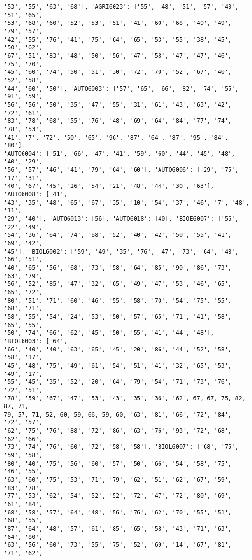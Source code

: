 \documentclass[11pt]{article}
\begin{document}
\begin{Verbatim}[commandchars=\\\{\}]
'53', '55', '63', '68'], 'AGRI6023': ['55', '48', '51', '57', '40', '51', '65',
'53', '68', '60', '52', '53', '51', '41', '60', '68', '49', '49', '79', '57',
'42', '55', '76', '41', '75', '64', '65', '53', '55', '38', '45', '50', '62',
'67', '51', '83', '48', '50', '56', '47', '58', '47', '47', '46', '75', '70',
'45', '60', '74', '50', '51', '30', '72', '70', '52', '67', '40', '52', '58',
'44', '60', '50'], 'AUTO6003': ['57', '65', '66', '82', '74', '55', '91', '59',
'56', '56', '50', '35', '47', '55', '31', '61', '43', '63', '42', '72', '61',
'83', '78', '68', '55', '76', '48', '69', '64', '84', '77', '74', '78', '53',
'41', '7', '72', '50', '65', '96', '87', '64', '87', '95', '84', '80'],
'AUTO6004': ['51', '66', '47', '41', '59', '60', '44', '45', '48', '40', '29',
'56', '57', '46', '41', '79', '64', '60'], 'AUTO6006': ['29', '75', '17', '31',
'40', '67', '45', '26', '54', '21', '48', '44', '30', '63'], 'AUTO6008': ['41',
'43', '35', '48', '65', '67', '35', '10', '54', '37', '46', '7', '48', '11',
'29', '40'], 'AUTO6013': [56], 'AUTO6018': [40], 'BIOE6007': ['56', '22', '49',
'54', '36', '64', '74', '68', '52', '40', '42', '50', '55', '41', '69', '42',
'45'], 'BIOL6002': ['59', '49', '35', '76', '47', '73', '64', '48', '66', '51',
'40', '65', '56', '68', '73', '58', '64', '85', '90', '86', '73', '63', '79',
'56', '52', '85', '47', '32', '65', '49', '47', '53', '46', '65', '65', '72',
'80', '51', '71', '60', '46', '55', '58', '70', '54', '75', '55', '68', '71',
'58', '55', '54', '24', '53', '50', '57', '65', '71', '41', '58', '65', '55',
'50', '74', '66', '62', '45', '50', '55', '41', '44', '48'], 'BIOL6003': ['64',
'66', '40', '40', '63', '65', '45', '20', '86', '44', '52', '58', '58', '17',
'45', '48', '75', '49', '61', '54', '51', '41', '32', '65', '53', '49', '17',
'55', '45', '35', '52', '20', '64', '79', '54', '71', '73', '76', '72', '51',
'78', '59', '67', '47', '53', '43', '35', '36', '62', 67, 67, 75, 82, 87, 71,
79, 57, 71, 52, 60, 59, 66, 59, 60, '63', '81', '66', '72', '84', '72', '57',
'62', '75', '76', '88', '72', '86', '63', '76', '93', '72', '68', '62', '66',
'73', '74', '76', '60', '72', '58', '58'], 'BIOL6007': ['68', '75', '59', '58',
'80', '40', '75', '56', '60', '57', '50', '66', '54', '58', '75', '46', '55',
'63', '60', '75', '53', '71', '79', '62', '51', '62', '67', '59', '83', '78',
'77', '53', '62', '54', '52', '52', '72', '47', '72', '80', '69', '61', '84',
'68', '58', '57', '64', '48', '56', '76', '62', '70', '55', '51', '68', '55',
'87', '64', '48', '57', '61', '85', '65', '58', '43', '71', '63', '64', '80',
'63', '56', '60', '73', '55', '75', '52', '69', '14', '67', '81', '71', '62',

\end{Verbatim}
\end{document}
